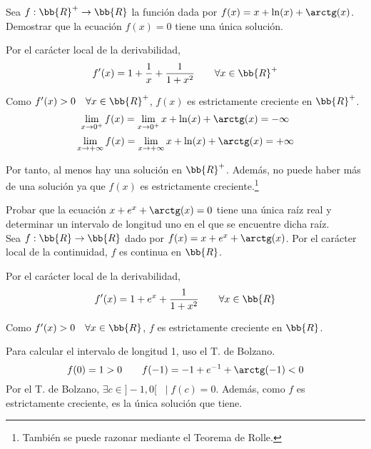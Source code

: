 \begin{ejercicio}
    Sea $f:\bb{R}^+ \to \bb{R}$ la función dada por $f(x)=x + \ln(x) + \arctg(x)$. Demostrar que la ecuación $f(x)=0$ tiene una única solución.

    Por el carácter local de la derivabilidad,
    $$f'(x) = 1+\frac{1}{x} + \frac{1}{1+x^2} \qquad \forall x\in \bb{R}^+$$

    Como $f'(x)>0 \quad \forall x\in \bb{R}^+$, $f(x)$ es estrictamente creciente en $\bb{R}^+$.
    \begin{equation*}
        \lim_{x\to0^+}f(x) = \lim_{x\to0^+} x + \ln(x) + \arctg(x) = -\infty
    \end{equation*}
    \begin{equation*}
        \lim_{x\to +\infty}f(x) = \lim_{x\to + \infty} x + \ln(x) + \arctg(x) = +\infty
    \end{equation*}

    Por tanto, al menos hay una solución en $\bb{R}^+$. Además, no puede haber más de una solución ya que $f(x)$ es estrictamente creciente.\footnote{También se puede razonar mediante el Teorema de Rolle.}
\end{ejercicio}

\begin{ejercicio}
    Probar que la ecuación $x + e^x + \arctg(x)=0 $ tiene una única raíz real y determinar un intervalo de longitud uno en el que se encuentre dicha raíz.\\
    
    Sea $f:\bb{R}\to \bb{R}$ dado por $f(x)=x + e^x + \arctg(x)$. Por el carácter local de la continuidad, $f$ es continua en $\bb{R}$.
    
    Por el carácter local de la derivabilidad,
    $$f'(x) = 1+e^x + \frac{1}{1+x^2} \qquad \forall x \in \bb{R}$$

    Como $f'(x)>0 \quad \forall x \in \bb{R}$, $f$ es estrictamente creciente en $\bb{R}$.

    Para calcular el intervalo de longitud 1, uso el T. de Bolzano.
    $$f(0)=1>0 \qquad f(-1)=-1+e^{-1}+\arctg(-1) < 0$$
    Por el T. de Bolzano, $\exists c \in ]-1,0[ \;\; \mid f(c) = 0$. Además, como $f$ es estrictamente creciente, es la única solución que tiene.
\end{ejercicio}

